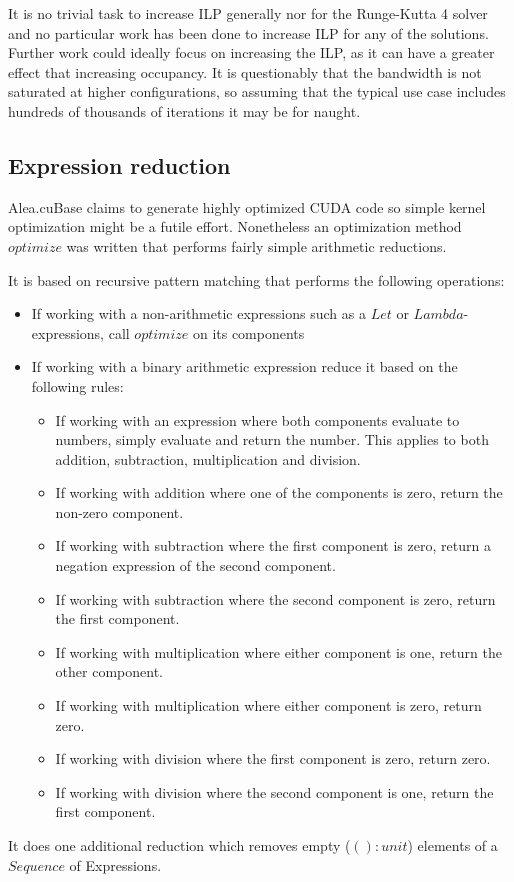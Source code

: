 It is no trivial task to increase ILP generally nor for the Runge-Kutta 4 solver and no particular work has been done to increase ILP for any of the solutions.
Further work could ideally focus on increasing the ILP, as it can have a greater effect that increasing occupancy.
It is questionably that the bandwidth is not saturated at higher configurations, so assuming that the typical use case includes hundreds of thousands of iterations it may be for naught.

\subsection{Expression reduction}\label{subsec:exprReduction}
Alea.cuBase claims to generate highly optimized CUDA code so simple kernel optimization might be a futile effort.
Nonetheless an optimization method $optimize$ was written that performs fairly simple arithmetic reductions.

It is based on recursive pattern matching that performs the following operations:
\begin{itemize}
\item If working with a non-arithmetic expressions such as a $Let$ or $Lambda$-expressions, call $optimize$ on its components
\item If working with a binary arithmetic expression reduce it based on the following rules:
	\begin{itemize}
	\item If working with an expression where both components evaluate to numbers, simply evaluate and return the number. This applies to both addition, subtraction, multiplication and division.
	\item If working with addition where one of the components is zero, return the non-zero component.
	\item If working with subtraction where the first component is zero, return a negation expression of the second component.
	\item If working with subtraction where the second component is zero, return the first component.
	\item If working with multiplication where either component is one, return the other component.
	\item If working with multiplication where either component is zero, return zero.
	\item If working with division where the first component is zero, return zero.
	\item If working with division where the second component is one, return the first component.
	\end{itemize}
\end{itemize}
It does one additional reduction which removes empty ($() : unit$) elements of a $Sequence$ of Expressions.

